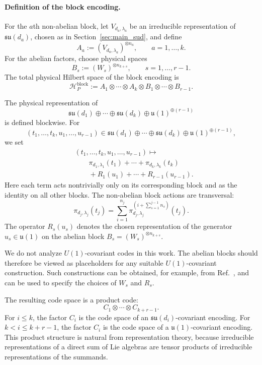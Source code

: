 \documentclass[10pt,twocolumn,superscriptaddress,aps,amsmath,amssymb,citeautoscript,floatfix,prx]{revtex4-2}
\newcounter{alg}
\theoremstyle{plain}
\theoremstyle{plain}
\theoremstyle{plain}
\theoremstyle{plain}
\theoremstyle{plain}
\theoremstyle{plain}
\theoremstyle{plain}
\theoremstyle{definition}
\theoremstyle{plain}
\begin{document}
\paragraph{Definition of the block encoding.}

For the $a$th non-abelian block, let $V_{d_a,\lambda_a}$ be an irreducible representation of $\mathfrak{su}(d_a)$, chosen as in Section~\ref{sec:main_sud}, and define
$$
A_a
:=
(V_{d_a,\lambda_a})^{\otimes n_a},
\qquad
a=1,\ldots,k .
$$
For the abelian factors, choose physical spaces
$$
B_s
:=
(W_s)^{\otimes n_{k+s}},
\qquad
s=1,\ldots,r-1 .
$$
The total physical Hilbert space of the block encoding is
$$
\mathcal H_P^{\mathrm{block}}
:=
A_1
\otimes
\cdots
\otimes
A_k
\otimes
B_1
\otimes
\cdots
\otimes
B_{r-1}.
$$

The physical representation of
$$
\mathfrak{su}(d_1)
\oplus
\cdots
\oplus
\mathfrak{su}(d_k)
\oplus
\mathfrak{u}(1)^{\oplus(r-1)}
$$
is defined blockwise. For
$$
(t_1,\ldots,t_k,u_1,\ldots,u_{r-1})
\in
\mathfrak{su}(d_1)
\oplus
\cdots
\oplus
\mathfrak{su}(d_k)
\oplus
\mathfrak{u}(1)^{\oplus(r-1)},
$$
we set
\begin{equation}\label{eq:block_enc_def}
\begin{aligned}
&(t_1,\ldots,t_k,u_1,\ldots,u_{r-1})
\longmapsto
\\
&\qquad
\pi_{d_1,\lambda_1}(t_1)
+
\cdots
+
\pi_{d_k,\lambda_k}(t_k)\\
&\qquad+
R_1(u_1)
+
\cdots
+
R_{r-1}(u_{r-1}) .
\end{aligned}
\end{equation}
Here each term acts nontrivially only on its corresponding block and as the identity on all other blocks. The non-abelian block actions are transversal:
\begin{equation}
\pi_{d_j,\lambda_j}(t_j)
=
\sum_{i=1}^{n_j}
\pi_{d_j,\lambda_j}^{(i+\sum_{s=1}^{j-1}n_s)}(t_j).
\end{equation}
The operator $R_s(u_s)$ denotes the chosen representation of the generator $u_s\in\mathfrak{u}(1)$ on the abelian block $B_s=(W_s)^{\otimes n_{k+s}}$.

We do not analyze $U(1)$-covariant codes in this work. The abelian blocks should therefore be viewed as placeholders 
for any suitable $U(1)$-covariant construction. Such constructions can be obtained, for example, from Ref.~\cite{Lin2025}, 
and can be used to specify the choices of $W_s$ and $R_s$.

The resulting code space is a product code:
\begin{equation}\label{eq:product_code}
C_1
\otimes
\cdots
\otimes
C_{k+r-1}.
\end{equation}
For $i\le k$, the factor $C_i$ is the code space of an $\mathfrak{su}(d_i)$-covariant encoding. For $k<i\le k+r-1$, the factor $C_i$ is the code space of a 
$\mathfrak{u}(1)$-covariant encoding. This product structure is natural from representation theory, because irreducible representations of a direct sum of Lie algebras 
are tensor products of irreducible representations of the summands.
\end{document}
